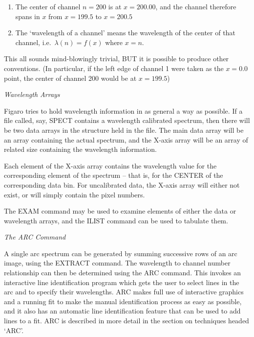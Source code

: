 \begin{enumerate}
\item The center of channel $n=200$ is at $x=200.00$, and the channel
   therefore spans in $x$ from $x=199.5$ to $x=200.5$
\item The `wavelength of a channel' means the wavelength of the center
   of that channel, i.e.\ $\lambda(n)=f(x)$ where $x=n$.
\end{enumerate}

This all sounds mind-blowingly trivial, BUT it is
possible to produce other conventions.  (In particular,
if the left edge of channel 1 were taken as the $x=0.0$
point, the center of channel 200 would be at $x=199.5$)


\goodbreak
\vspace{12pt}
{\it Wavelength Arrays}

Figaro tries to hold wavelength information in as general a way 
as possible.  If a file called, say, SPECT contains a wavelength calibrated
spectrum, then there will be two data arrays in the structure held in the
file.  The main data array will be an array
containing the actual spectrum, and 
the X-axis array will be an array of related size containing the wavelength
information.

Each element of the X-axis array contains the wavelength value for
the corresponding element of the spectrum -- that is, for the CENTER of the
corresponding data bin.  For uncalibrated data, the X-axis array will
either not exist, or will simply contain the pixel numbers.

The EXAM command may be used to examine elements of either the data
or wavelength arrays, and the ILIST command can be used to tabulate them.


\goodbreak
\vspace{12pt}
{\it The ARC Command}

A single arc spectrum can be generated by summing successive rows of
an arc image, using the EXTRACT command.  The wavelength to channel number
relationship can then be determined using the ARC command.  This invokes
an interactive line identification program which gets the user to select
lines in the arc and to specify their wavelengths.  ARC makes full use of
interactive graphics and a running fit to make the manual identification
process as easy as possible, and it also has an automatic line identification
feature that can be used to add lines to a fit.  ARC is
described in more detail in the section on techniques headed `ARC'.


